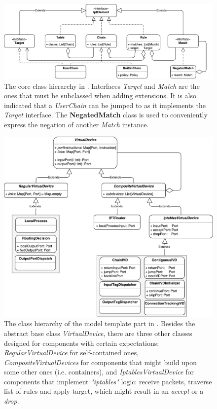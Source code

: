 \begin{figure}[h]
  \centering

  \includegraphics[scale=0.5]{assets/img/ipt-hierarchy}
  \caption[The core class hierarchy in \TOOL.]{The core class hierarchy in
  \TOOL.  Interfaces \emph{Target} and \emph{Match} are the ones that must be
  subclassed when adding extensions.  It is also indicated that a
  \emph{UserChain} can be jumped to as it implements the \emph{Target}
  interface.  The \textbf{NegatedMatch} class is used to conveniently express
  the negation of another \emph{Match} instance.}
  \label{fig:ipt-hierarchy}
\end{figure}
\clearpage

\begin{figure}[h]
  \centering

  \includegraphics[scale=0.55]{assets/img/virtdev-hierarchy}
  \caption[The class hierarchy that defines the model template part in
  \TOOL.]{The class hierarchy of the model template part in \TOOL. Besides the
  abstract base class \emph{VirtualDevice}, there are three other classes
  designed for components with certain expectations:
  \emph{RegularVirtualDevice} for self-contained ones,
  \emph{CompositeVirtualDevices} for components that might build upon some
  other ones (i.e. containers), and \emph{IptablesVirtualDevice} for components
  that implement \emph{"iptables"} logic: receive packets, traverse list of
  rules and apply target, which might result in an \emph{accept} or a
  \emph{drop}.}
  \label{fig:virtdev-hierarchy}
\end{figure}

